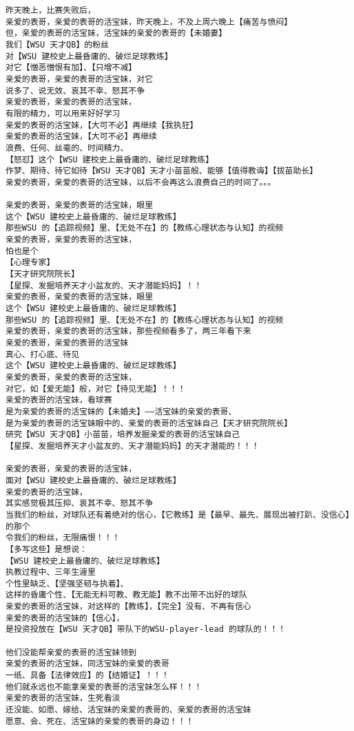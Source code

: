\documentclass[9pt, b5paper]{article}
\begin{document}
\begin{verbatim}
昨天晚上，比赛失败后，
亲爱的表哥，亲爱的表哥的活宝妹，昨天晚上，不及上周六晚上【痛苦与愤闷】
但，亲爱的表哥的活宝妹，活宝妹的亲爱的表哥的【未婚妻】
我们【WSU 天才QB】的粉丝
对【WSU 建校史上最昏庸的、破烂足球教练】
对它【憎恶憎恨有加】、【只增不减】
亲爱的表哥，亲爱的表哥的活宝妹，对它
说多了、说无效、哀其不幸、怒其不争
亲爱的表哥，亲爱的表哥的活宝妹，
有限的精力，可以用来好好学习
亲爱的表哥的活宝妹，【大可不必】再继续【我执狂】
亲爱的表哥的活宝妹，【大可不必】再继续
浪费、任何、丝毫的、时间精力、
【怒怼】这个【WSU 建校史上最昏庸的、破烂足球教练】
作梦、期待、待它如待【WSU 天才QB】天才小苗苗般、能够【值得教诲】【拔苗助长】
亲爱的表哥，亲爱的表哥的活宝妹，以后不会再这么浪费自己的时间了。。。

亲爱的表哥，亲爱的表哥的活宝妹，眼里
这个【WSU 建校史上最昏庸的、破烂足球教练】
那些WSU 的【追踪视频】里、【无处不在】的【教练心理状态与认知】的视频 
亲爱的表哥，亲爱的表哥的活宝妹，
怕也是个
【心理专家】
【天才研究院院长】
【星探、发掘培养天才小盆友的、天才潜能妈妈】！！
亲爱的表哥，亲爱的表哥的活宝妹，眼里
这个【WSU 建校史上最昏庸的、破烂足球教练】
那些WSU 的【追踪视频】里、【无处不在】的【教练心理状态与认知】的视频 
亲爱的表哥，亲爱的表哥的活宝妹，那些视频看多了，两三年看下来
亲爱的表哥，亲爱的表哥的活宝妹 
真心、打心底、待见
这个【WSU 建校史上最昏庸的、破烂足球教练】
亲爱的表哥，亲爱的表哥的活宝妹，
对它，如【爱无能】般，对它【待见无能】！！！
亲爱的表哥的活宝妹，看球赛
是为亲爱的表哥的活宝妹的【未婚夫】——活宝妹的亲爱的表哥、
是为亲爱的表哥的活宝妹眼中的、亲爱的表哥的活宝妹自己【天才研究院院长】
研究【WSU 天才QB】小苗苗，培养发掘亲爱的表哥的活宝妹自己
【星探、发掘培养天才小盆友的、天才潜能妈妈】的天才潜能的！！！

亲爱的表哥，亲爱的表哥的活宝妹，
面对【WSU 建校史上最昏庸的、破烂足球教练】
亲爱的表哥的活宝妹，
其实感觉极其压抑、哀其不幸、怒其不争
当我们的粉丝，对球队还有着绝对的信心，【它教练】是【最早、最先、展现出被打趴、没信心】的那个
令我们的粉丝，无限痛恨！！！
【多写这些】是想说：
【WSU 建校史上最昏庸的、破烂足球教练】
执教过程中、三年生漄里
个性里缺乏、【坚强坚韧与执着】、
这样的昏庸个性、【无能无料可教、教无能】教不出带不出好的球队
亲爱的表哥的活宝妹，对这样的【教练】，【完全】没有、不再有信心
亲爱的表哥的活宝妹的【信心】，
是投资投放在【WSU 天才QB】带队下的WSU-player-lead 的球队的！！！

他们没能帮亲爱的表哥的活宝妹领到
亲爱的表哥的活宝妹，同活宝妹的亲爱的表哥
一纸、具备【法律效应】的【结婚证】！！！
他们就永远也不能拿亲爱的表哥的活宝妹怎么样！！！
亲爱的表哥的活宝妹，生死看淡
还没能、如愿、嫁给、活宝妹的亲爱的表哥的、亲爱的表哥的活宝妹
愿意、会、死在、活宝妹的亲爱的表哥的身边！！！


\end{verbatim}
\end{document}
